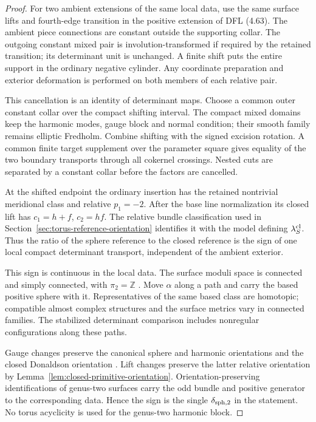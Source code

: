 \documentclass[11pt]{amsart}
\theoremstyle{definition}
\theoremstyle{remark}
\theoremstyle{plain}
\begin{document}
\begin{proof}
For two ambient extensions of the same local data,
use the same surface lifts and fourth-edge transition
in the positive extension of DFL (4.63).
The ambient piece connections are constant outside
the supporting collar. The outgoing constant
mixed pair is involution-transformed if required
by the retained transition; its determinant unit
is unchanged. A finite shift puts the entire
support in the ordinary negative cylinder.
Any coordinate preparation and exterior deformation
is performed on both members of each relative pair.

This cancellation is an identity of determinant
maps. Choose a common outer constant collar
over the compact shifting interval. The compact
mixed domains keep the harmonic modes, gauge
block and normal condition; their smooth family
remains elliptic Fredholm. Combine shifting
with the signed excision rotation. A common
finite target supplement over the parameter
square gives equality of the two boundary
transports through all cokernel crossings.
Nested cuts are separated by a constant collar
before the factors are cancelled.

At the shifted endpoint the ordinary insertion
has the retained nontrivial meridional class
and relative $p_1=-2$. After the base line
normalization its closed lift has $c_1=h+f$,
$c_2=hf$. The relative bundle classification
used in Section~\ref{sec:torus-reference-orientation}
identifies it with the model defining
$\lambda_S^{\rm cl}$. Thus the ratio of
the sphere reference to the closed reference
is the sign of one local compact determinant
transport, independent of the ambient exterior.

This sign is continuous in the local data.
The surface moduli space is connected and simply
connected, with $\pi_2=\mathbb Z$
\cite[Section~2.2, p.~8]{DaeFukLip21a}.
Move $\alpha$ along a path and carry the based
positive sphere with it. Representatives of
the same based class are homotopic; compatible
almost complex structures and the surface
metrics vary in connected families.
The stabilized determinant comparison includes
nonregular configurations along these paths.

Gauge changes preserve the canonical sphere
and harmonic orientations and the closed
Donaldson orientation
\cite[Corollary~3.27]{Donaldson87}.
Lift changes preserve the latter relative
orientation by
Lemma~\ref{lem:closed-primitive-orientation}.
Orientation-preserving identifications of
genus-two surfaces carry the odd bundle
and positive generator to the corresponding
data. Hence the sign is the single $\delta_{{\rm sph},2}$
in the statement. No torus acyclicity is
used for the genus-two harmonic block.
\end{proof}
\end{document}
